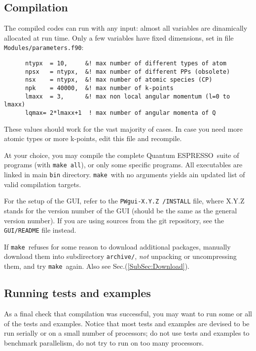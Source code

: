 \documentclass[12pt,a4paper]{article}
\def\qe{{\sc Quantum ESPRESSO}}
\def\make{\texttt{make}}
\begin{document}
\subsection{Compilation}
\label{SubSec:Compilation}

The compiled codes can run with any input: almost all variables are
dinamically allocated at run time. Only a few variables have fixed
dimensions, set in file \texttt{Modules/parameters.f90}:
\begin{verbatim}
      ntypx  = 10,     &! max number of different types of atom
      npsx   = ntypx,  &! max number of different PPs (obsolete)
      nsx    = ntypx,  &! max number of atomic species (CP)
      npk    = 40000,  &! max number of k-points
      lmaxx  = 3,      &! max non local angular momentum (l=0 to lmaxx)
      lqmax= 2*lmaxx+1  ! max number of angular momenta of Q
\end{verbatim}
These values should work for the vast majority of cases. In case you need
more atomic types or more k-points, edit this file and recompile.

At your choice, you may compile the complete \qe\ suite of programs
(with \texttt{make all}), or only some specific programs.
All executables are linked in main \texttt{bin} directory.
\make\ with no arguments yields ain updated list of valid compilation targets.

For the setup of the GUI, refer to the \texttt{PWgui-X.Y.Z /INSTALL} file, where
X.Y.Z stands for the version number of the GUI (should be the same as the
general version number). If you are using sources from the git repository, see
the \texttt{GUI/README} file instead.

If \make\ refuses for some reason to download additional
packages, manually download them into subdirectory
\texttt{archive/}, {\em not} unpacking or uncompressing them,
and try \make\ again. Also see Sec.(\ref{SubSec:Download}).

\subsection{Running tests and examples}
\label{SubSec:Examples}

As a final check that compilation was successful, you may want to run some or
all of the tests and examples.
Notice that most tests and examples are devised to be run serially
or on a small number of processors; do not use tests and examples
to benchmark parallelism, do not try to run on too many processors.
\end{document}
